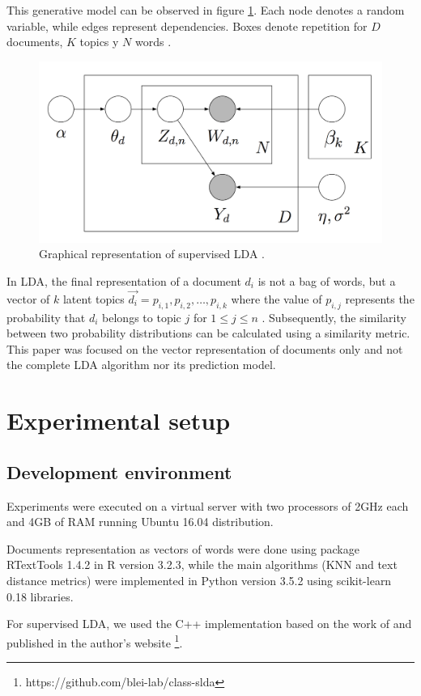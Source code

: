 \documentclass[preprint,12pt,3p]{elsarticle}
\begin{document}
This generative model can be observed in figure \ref{figure-sLDA}. Each node denotes a random variable, while edges represent dependencies. Boxes denote repetition for $D$ documents, $K$ topics y $N$ words \cite{srivastava2009text}.

\begin{figure}[h]
\caption{Graphical representation of supervised LDA \cite{mcauliffe2008supervised}.}
\label{figure-sLDA}
\includegraphics[width=\textwidth]{sLDA}
\end{figure}

In LDA, the final representation of a document ${d_{i}}$ is not a bag of words, but a vector of $k$ latent topics ${\vec{d_{i}}=p_{i,1}, p_{i,2},…, p_{i,k}}$ where the value of ${p_{i,j}}$ represents the probability that ${d_{i}}$ belongs to topic $j$ for ${1 \leq  j \leq  n}$ \cite{ bae2014computing, aggarwal2015data}. Subsequently, the similarity between two probability distributions can be calculated using a similarity metric. This paper was focused on the vector representation of documents only and not the complete LDA algorithm nor its prediction model.


\section{Experimental setup}
\label{experimental_setup}

\subsection{Development environment}

Experiments were executed on a virtual server with two processors of 2GHz each and 4GB of RAM running Ubuntu 16.04 distribution.\par
Documents representation as vectors of words were done using package RTextTools 1.4.2 in R version 3.2.3, while the main algorithms (KNN and text distance metrics) were implemented in Python version 3.5.2 using scikit-learn 0.18 libraries.\par
For supervised LDA, we used the C++ implementation based on the work of \cite{mcauliffe2008supervised,chong2009simultaneous} and published in the author's website \footnote{https://github.com/blei-lab/class-slda}.
\end{document}
